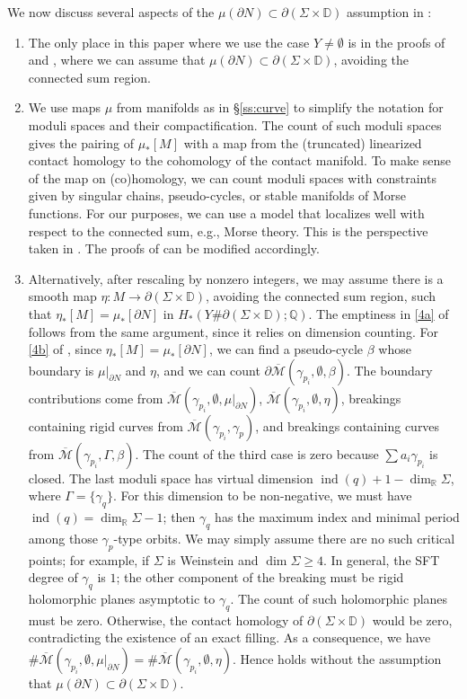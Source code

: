 \documentclass[11pt]{amsart}
\numberwithin{equation}{section}
\def\R{\mathbb{R}}
\def\D{{\mathbb D}}
\def\Q{{\mathbb Q}}
\def\cM{{\mathcal M}}
\DeclareMathOperator{\ind}{ind}
\begin{document}
We now discuss several aspects of the $\mu(\partial N) \subset \partial(\Sigma \times \D)$ assumption in :
\begin{enumerate}
    \item The only place in this paper where we use the case $Y\ne \emptyset$ is in the proofs of  and , where we can assume that $\mu(\partial N) \subset \partial(\Sigma \times \D)$, avoiding the connected sum region. 
    \item We use maps $\mu$ from manifolds as in \S \ref{ss:curve} to simplify the notation for moduli spaces and their compactification. The count of such moduli spaces gives the pairing of $\mu_*[M]$ with a map from the (truncated) linearized contact homology to the cohomology of the contact manifold. To make sense of the map on (co)homology, we can count moduli spaces with constraints given by singular chains, pseudo-cycles, or stable manifolds of Morse functions. For our purposes, we can use a model that localizes well with respect to the connected sum, e.g., Morse theory. This is the perspective taken in \cite{bowden2022tight}. The proofs of  can be modified accordingly. 
    \item Alternatively, after rescaling by nonzero integers, we may assume there is a smooth map $\eta:M\to \partial(\Sigma \times \D)$, avoiding the connected sum region, such that $\eta_*[M]=\mu_*[\partial N]$ in $H_*(Y\#\partial(\Sigma \times \D);\Q)$. The emptiness in \eqref{4a} of  follows from the same argument, since it relies on dimension counting. For \eqref{4b} of , since $\eta_*[M]=\mu_*[\partial N]$, we can find a pseudo-cycle $\beta$ whose boundary is $\mu|_{\partial N}$ and $\eta$, and we can count $\partial\overline{\cM}(\gamma_{p_i},\emptyset,\beta)$. The boundary contributions come from $\overline{\cM}(\gamma_{p_i},\emptyset,\mu|_{\partial N})$, $\overline{\cM}(\gamma_{p_i},\emptyset,\eta)$, breakings containing rigid curves from $\overline{\cM}(\gamma_{p_i},\gamma_p)$, and breakings containing curves from $\overline{\cM}(\gamma_{p_i},\Gamma,\beta)$. The count of the third case is zero because $\sum a_i\gamma_{p_i}$ is closed. The last moduli space has virtual dimension $\ind(q)+1-\dim_{\R}\Sigma$, where $\Gamma=\{\gamma_q\}$. For this dimension to be non-negative, we must have $\ind(q)=\dim_{\R}\Sigma -1$; then $\gamma_q$ has the maximum index and minimal period among those $\gamma_p$-type orbits. We may simply assume there are no such critical points; for example, if $\Sigma$ is Weinstein and $\dim \Sigma \ge 4$. In general, the SFT degree of $\gamma_q$ is $1$; the other component of the breaking must be rigid holomorphic planes asymptotic to $\gamma_q$. The count of such holomorphic planes must be zero. Otherwise, the contact homology of $\partial(\Sigma \times \D)$ would be zero, contradicting the existence of an exact filling. As a consequence, we have $\#\overline{\cM}(\gamma_{p_i},\emptyset,\mu|_{\partial N})=\# \overline{\cM}(\gamma_{p_i},\emptyset,\eta)$. Hence  holds without the assumption that $\mu(\partial N) \subset \partial(\Sigma \times \D)$.
\end{enumerate}
\end{document}
